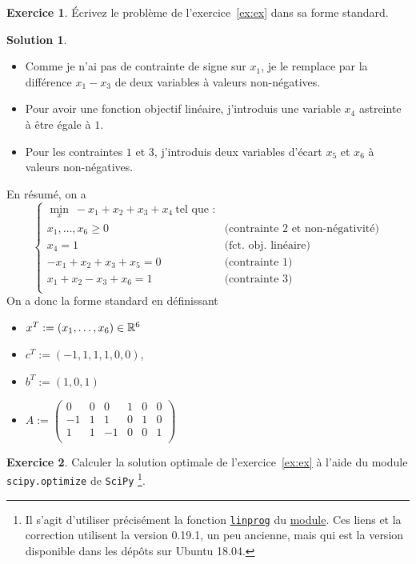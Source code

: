 \documentclass[a4paper,francais]{article}
\newcommand{\R}{{\ensuremath\mathbb{R}}}
\theoremstyle{definition}
\newtheorem{exercice}{Exercice}[section]
\newtheorem*{solution}{Solution}
\begin{document}
\begin{exercice}
\'Ecrivez le problème de l'exercice~\ref{ex:ex} dans sa forme standard.
\end{exercice}

\begin{solution}
  ~
  
  \begin{itemize}
  \item Comme je n'ai pas de contrainte de signe sur $x_1$, je le remplace
    par la différence $x_1 - x_3$ de deux variables à valeurs non-négatives.
  \item Pour avoir une fonction objectif linéaire, j'introduis une variable
    $x_4$ astreinte à être égale à $1$.
  \item Pour les contraintes $1$ et $3$, j'introduis deux variables d'écart $x_5$ et $x_6$
    à valeurs non-négatives. 
  \end{itemize}
En résumé, on a 
\[
\left\{
\begin{array}{cl}
  \min_x \ -x_1 + x_2 + x_3 + x_4 \ \text{tel que :} & \\
  x_1, \dots, x_6 \geq 0 & \text{(contrainte 2 et non-négativité)} \\
  x_4 = 1 & \text{(fct. obj. linéaire)} \\
  -x_1 + x_2 + x_3 + x_5  = 0 & \text{(contrainte 1)} \\
  x_1 + x_2 - x_3 + x_6 = 1   & \text{(contrainte 3)} \\
\end{array}
\right.
\]
On a donc la forme standard en définissant
\begin{itemize}
\item $x^T := (x_1, \dots, x_6) \in \R^6$
\item $c^T := (-1, 1, 1, 1, 0, 0)$,
\item $b^T := (1, 0, 1)$
\item $A :=
  \left(
  \begin{array}{cccccc}
    0 & 0 & 0 & 1 & 0 & 0 \\
    -1 & 1 & 1 & 0 & 1 & 0 \\
    1 & 1 & -1 & 0 & 0 & 1 \\
  \end{array}
  \right)$
\end{itemize}
\end{solution}

\begin{exercice}
  Calculer la solution optimale de l'exercice~\ref{ex:ex} à l'aide
  du module \texttt{scipy.optimize} de \texttt{SciPy}
  \footnote{Il s'agit d'utiliser précisément la fonction
    \href{https://docs.scipy.org/doc/scipy-0.19.1/reference/optimize.linprog-simplex.html}{\texttt{linprog}}
    du \href{https://docs.scipy.org/doc/scipy-0.19.1/reference/optimize.html\#module-scipy.optimize}{module}.
    Ces liens et la correction utilisent la version 0.19.1, un peu ancienne, mais qui est la version disponible
    dans les dépôts sur Ubuntu 18.04.}. 
\end{exercice}
\end{document}
